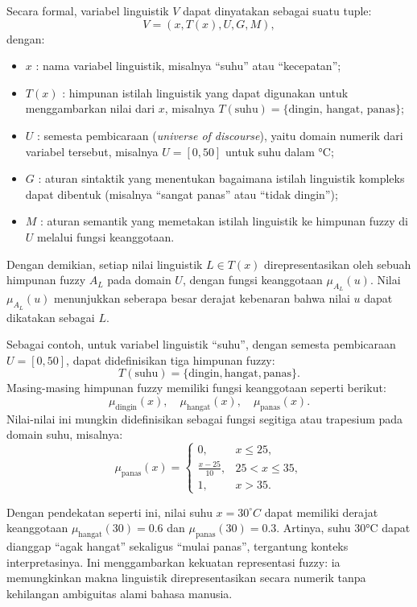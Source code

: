 \documentclass[12pt,a4paper]{article}
\theoremstyle{remark}
\begin{document}
Secara formal, variabel linguistik \(V\) dapat dinyatakan sebagai suatu tuple:
\[
    V = (x, T(x), U, G, M),
\]
dengan:
\begin{itemize}
    \item \(x\) : nama variabel linguistik, misalnya “suhu” atau “kecepatan”;
    \item \(T(x)\) : himpunan istilah linguistik yang dapat digunakan untuk menggambarkan nilai dari \(x\), misalnya \(T(\text{suhu}) = \{\text{dingin, hangat, panas}\}\);
    \item \(U\) : semesta pembicaraan (\textit{universe of discourse}), yaitu domain numerik dari variabel tersebut, misalnya \(U = [0, 50]\) untuk suhu dalam °C;
    \item \(G\) : aturan sintaktik yang menentukan bagaimana istilah linguistik kompleks dapat dibentuk (misalnya “sangat panas” atau “tidak dingin”);
    \item \(M\) : aturan semantik yang memetakan istilah linguistik ke himpunan fuzzy di \(U\) melalui fungsi keanggotaan.
\end{itemize}

Dengan demikian, setiap nilai linguistik \(L \in T(x)\) direpresentasikan oleh sebuah himpunan fuzzy \(A_L\) pada domain \(U\), dengan fungsi keanggotaan \(\mu_{A_L}(u)\). Nilai \(\mu_{A_L}(u)\) menunjukkan seberapa besar derajat kebenaran bahwa nilai \(u\) dapat dikatakan sebagai \(L\).

Sebagai contoh, untuk variabel linguistik “suhu”, dengan semesta pembicaraan \(U = [0, 50]\), dapat didefinisikan tiga himpunan fuzzy:
\[
    T(\text{suhu}) = \{\text{dingin}, \text{hangat}, \text{panas}\}.
\]
Masing-masing himpunan fuzzy memiliki fungsi keanggotaan seperti berikut:
\[
    \mu_{\text{dingin}}(x), \quad \mu_{\text{hangat}}(x), \quad \mu_{\text{panas}}(x).
\]
Nilai-nilai ini mungkin didefinisikan sebagai fungsi segitiga atau trapesium pada domain suhu, misalnya:
\[
    \mu_{\text{panas}}(x) =
    \begin{cases}
        0,                 & x \leq 25,      \\
        \frac{x - 25}{10}, & 25 < x \leq 35, \\
        1,                 & x > 35.
    \end{cases}
\]

Dengan pendekatan seperti ini, nilai suhu \(x = 30^\circ C\) dapat memiliki derajat keanggotaan \(\mu_{\text{hangat}}(30) = 0.6\) dan \(\mu_{\text{panas}}(30) = 0.3\). Artinya, suhu 30°C dapat dianggap “agak hangat” sekaligus “mulai panas”, tergantung konteks interpretasinya. Ini menggambarkan kekuatan representasi fuzzy: ia memungkinkan makna linguistik direpresentasikan secara numerik tanpa kehilangan ambiguitas alami bahasa manusia.
\end{document}
